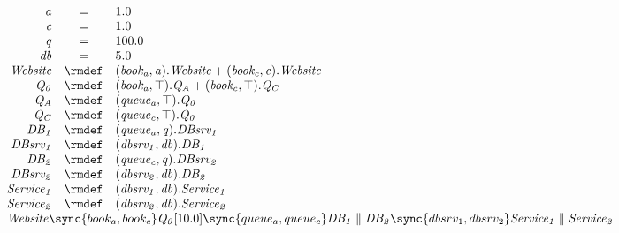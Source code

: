 \begin{displaymath}
	\begin{array}{rcl}
		\mathit{a} & = & 1.0\\
		\mathit{c} & = & 1.0\\
		\mathit{q} & = & 100.0\\
		\mathit{db} & = & 5.0\\
[0.0ex]		\mathit{Website} & \rmdef & (\mathit{book_a},\mathit{a}).\mathit{Website}+(\mathit{book_c},\mathit{c}).\mathit{Website}\\
		\mathit{Q_0} & \rmdef & (\mathit{book_a},\top).\mathit{Q_A}+(\mathit{book_c},\top).\mathit{Q_C}\\
		\mathit{Q_A} & \rmdef & (\mathit{queue_a},\top).\mathit{Q_0}\\
		\mathit{Q_C} & \rmdef & (\mathit{queue_c},\top).\mathit{Q_0}\\
		\mathit{DB_1} & \rmdef & (\mathit{queue_a},\mathit{q}).\mathit{DBsrv_1}\\
		\mathit{DBsrv_1} & \rmdef & (\mathit{dbsrv_1},\mathit{db}).\mathit{DB_1}\\
		\mathit{DB_2} & \rmdef & (\mathit{queue_c},\mathit{q}).\mathit{DBsrv_2}\\
		\mathit{DBsrv_2} & \rmdef & (\mathit{dbsrv_2},\mathit{db}).\mathit{DB_2}\\
		\mathit{Service_1} & \rmdef & (\mathit{dbsrv_1},\mathit{db}).\mathit{Service_1}\\
		\mathit{Service_2} & \rmdef & (\mathit{dbsrv_2},\mathit{db}).\mathit{Service_2}\\
[0.0ex]		\multicolumn{3}{l}{\mathit{Website}\sync{book_a,book_c}\mathit{Q_0}[10.0]\sync{queue_a,queue_c}\mathit{DB_1}\parallel\mathit{DB_2}\sync{dbsrv_1,dbsrv_2}\mathit{Service_1}\parallel\mathit{Service_2}}\\
[0.0ex]	\end{array}
\end{displaymath}
